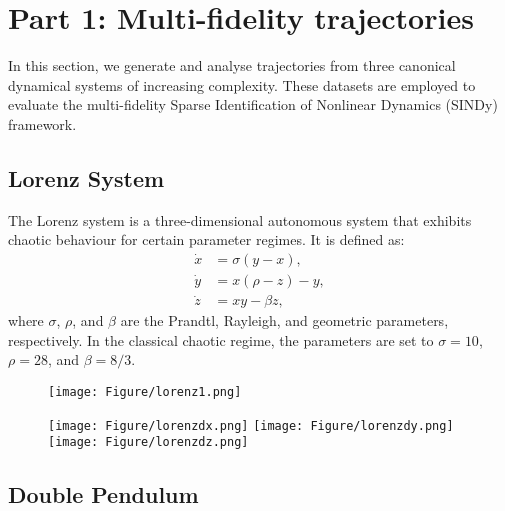 \section{Part 1: Multi-fidelity trajectories}

In this section, we generate and analyse trajectories from three canonical dynamical systems of increasing complexity. These datasets are employed to evaluate the multi-fidelity Sparse Identification of Nonlinear Dynamics (SINDy) framework.

\subsection{Lorenz System}

The Lorenz system is a three-dimensional autonomous system that exhibits chaotic behaviour for certain parameter regimes. It is defined as:
\begin{equation}
\begin{aligned}
\dot{x} &= \sigma (y - x), \\
\dot{y} &= x(\rho - z) - y, \\
\dot{z} &= xy - \beta z,
\end{aligned}
\label{eq:lorenz}
\end{equation}
where $\sigma$, $\rho$, and $\beta$ are the Prandtl, Rayleigh, and geometric parameters, respectively. In the classical chaotic regime, the parameters are set to $\sigma = 10$, $\rho = 28$, and $\beta = 8/3$.

\begin{figure}
    \texttt{[image: Figure/lorenz1.png]}
\end{figure}

\begin{figure}
    \begin{center}
    \texttt{[image: Figure/lorenzdx.png]}
    \texttt{[image: Figure/lorenzdy.png]}
    \texttt{[image: Figure/lorenzdz.png]}
    \end{center}
\end{figure}
\subsection{Double Pendulum}

